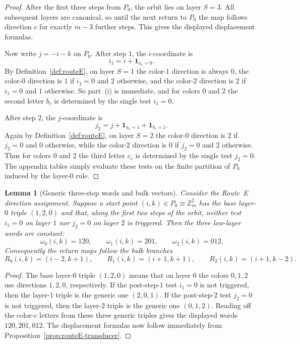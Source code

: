 \documentclass[11pt]{article}
\newtheorem{lemma}{Lemma}
\newcommand{\Zm}{\mathbb Z_m}
\begin{document}
\begin{proof}
After the first three steps from $P_0$, the orbit lies on layer $S=3$.
All subsequent layers are canonical, so until the next return to $P_0$ the map follows direction $c$ for exactly $m-3$ further steps.
This gives the displayed displacement formulas.

Now write $j=-i-k$ on $P_0$.
After step $1$, the $i$-coordinate is
\[
i_1=i+\mathbf 1_{a_c=0}.
\]
By Definition~\ref{def:routeE}, on layer $S=1$ the color-$1$ direction is always $0$, the color-$0$ direction is $1$ if $i_1=0$ and $2$ otherwise, and the color-$2$ direction is $2$ if $i_1=0$ and $1$ otherwise.
So part~\textup{(i)} is immediate, and for colors $0$ and $2$ the second letter $b_c$ is determined by the single test $i_1=0$.

After step $2$, the $j$-coordinate is
\[
j_2=j+\mathbf 1_{a_c=1}+\mathbf 1_{b_c=1}.
\]
Again by Definition~\ref{def:routeE}, on layer $S=2$ the color-$0$ direction is $2$ if $j_2=0$ and $0$ otherwise, while the color-$2$ direction is $0$ if $j_2=0$ and $2$ otherwise.
Thus for colors $0$ and $2$ the third letter $c_c$ is determined by the single test $j_2=0$.
The appendix tables simply evaluate these tests on the finite partition of $P_0$ induced by the layer-$0$ rule.
\end{proof}

\begin{lemma}[Generic three-step words and bulk vectors]\label{lem:routeE-generic}
Consider the Route~E direction assignment.
Suppose a start point $(i,k)\in P_0\cong\Zm^2$ has the base layer-$0$ triple $(1,2,0)$ and that, along the first two steps of the orbit, neither test $i_1=0$ on layer $1$ nor $j_2=0$ on layer $2$ is triggered.
Then the three low-layer words are constant:
\[
\omega_0(i,k)=120,\qquad \omega_1(i,k)=201,\qquad \omega_2(i,k)=012.
\]
Consequently the return maps follow the bulk branches
\[
R_0(i,k)=(i-2,k+1),\qquad R_1(i,k)=(i+1,k+1),\qquad R_2(i,k)=(i+1,k-2).
\]
\end{lemma}

\begin{proof}
The base layer-$0$ triple $(1,2,0)$ means that on layer $0$ the colors $0,1,2$ use directions $1,2,0$, respectively.
If the post-step-$1$ test $i_1=0$ is not triggered, then the layer-$1$ triple is the generic one $(2,0,1)$.
If the post-step-$2$ test $j_2=0$ is not triggered, then the layer-$2$ triple is the generic one $(0,1,2)$.
Reading off the color-$c$ letters from these three generic triples gives the displayed words $120,201,012$.
The displacement formulas now follow immediately from Proposition~\ref{prop:routeE-transducer}.
\end{proof}
\end{document}
